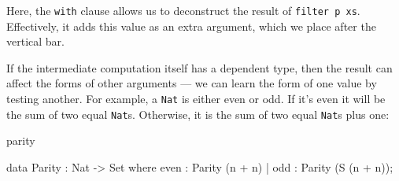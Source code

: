 \noindent
Here, the \texttt{with} clause allows us to deconstruct the result of 
\texttt{filter p xs}.
Effectively, it adds this value as an extra argument, which we place after the
vertical bar.

If the intermediate computation itself has a dependent type, then the result
can affect the forms of other arguments --- we can learn the form of one value by
testing another. For example, a \texttt{Nat} is either even or odd. If it's even it will
be the sum of two equal \texttt{Nat}s. Otherwise, it is the sum of two equal \texttt{Nat}s 
plus one:

\begin{SaveVerbatim}{parity}

data Parity : Nat -> Set where
   even : Parity (n + n)
 | odd  : Parity (S (n + n));

\end{SaveVerbatim}



